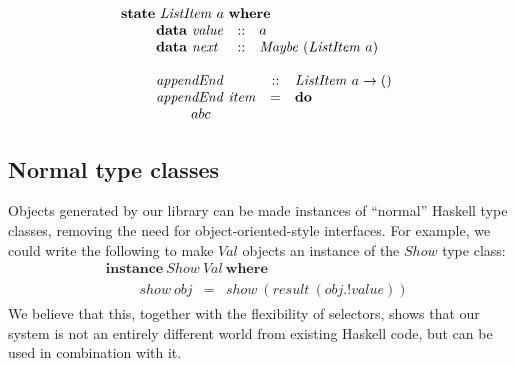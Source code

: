 \begin{displaymath}
\begin{array}{l}
\mathbf{state}~\mathit{ListItem}~a~\mathbf{where} \\
\qquad \begin{array}{lcl}
\mathbf{data}~\mathit{value} & :: & a \\
\mathbf{data}~\mathit{next}  & :: & \mathit{Maybe}~(\mathit{ListItem}~a)
\end{array}\\\\
\qquad \begin{array}{lcl}
\mathit{appendEnd} & :: & \mathit{ListItem}~a \to () \\
\mathit{appendEnd}~\mathit{item} & = & \mathbf{do} \\
 \multicolumn{3}{l}{\qquad \begin{array}{lcl}
abc&&
\end{array}}
\end{array}
\end{array}
\end{displaymath}

\subsection{Normal type classes}

Objects generated by our library can be made instances of ``normal'' Haskell type classes, removing the need for object-oriented-style interfaces. For example, we could write the following to make $\mathit{Val}$ objects an instance of the $\mathit{Show}$ type class:
\begin{displaymath}
\begin{array}{l}
\mathbf{instance}~\mathit{Show}~\mathit{Val}~\mathbf{where}\\
\qquad \begin{array}{lcl}
\mathit{show}~\mathit{obj} & = & \mathit{show}~(\mathit{result}~(\mathit{obj}.!\mathit{value})) 
\end{array}
\end{array}
\end{displaymath}
We believe that this, together with the flexibility of selectors, shows that our system is not an entirely different world from existing Haskell code, but can be used in combination with it.